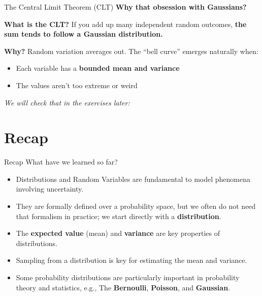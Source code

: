 \documentclass{beamer}
\begin{document}
\begin{frame}{The Central Limit Theorem (CLT)}
  \textbf{Why that obsession with Gaussians?}
  \vspace{0.5em}

\textbf{What is the CLT?}
\vspace{0.5em}
If you add up many independent random outcomes,
\textbf{the sum tends to follow a Gaussian distribution.}

\vspace{1em}
\textbf{Why?} Random variation averages out. The “bell curve” emerges naturally when:
\begin{itemize}
  \item Each variable has a \textbf{bounded mean and variance}
  \item The values aren’t too extreme or weird
\end{itemize}


\vspace{0.5em}
\textit{We will check that in the exercises later:}
\end{frame}

\section{Recap}

\begin{frame}{Recap}
  What have we learned so far?

  \begin{itemize}
  \item Distributions and Random Variables are fundamental to model phenomena involving uncertainty.
  \item They are formally defined over a probability space, but we often do not need that formalism in practice; we start directly with a \textbf{distribution}.
  \item The \textbf{expected value} (mean) and \textbf{variance} are key properties of distributions.
  \item Sampling from a distribution is key for estimating the mean and variance.
  \item Some probability distributions are particularly important in probability theory and statistics, e.g., The \textbf{Bernoulli}, \textbf{Poisson}, and \textbf{Gaussian}.
  \end{itemize}
  \vspace{0.5cm}
\end{frame}
\end{document}
